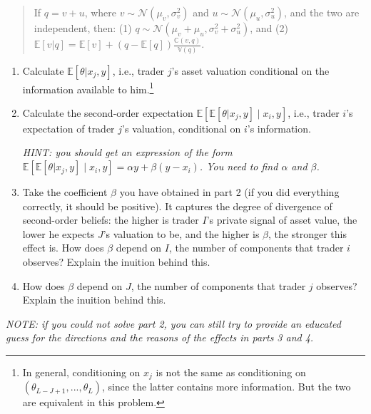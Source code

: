 \begin{quotation}
	If $q = v + u$, where $v \sim \mathcal{N}(\mu_v, \sigma_v^2)$ and $u \sim \mathcal{N}(\mu_u, \sigma_u^2)$, and the two are independent, then: (1) $q \sim \mathcal{N}(\mu_v+\mu_u, \sigma^2_v + \sigma^2_u)$, and (2) $\mathbb{E}[v|q] = \mathbb{E}[v] + (q-\mathbb{E}[q])\frac{\mathbb{C}(v,q)}{\mathbb{V}(q)}$.%
\end{quotation}
\begin{enumerate}%
	\item Calculate $\mathbb{E}\left[ \theta | x_j, y \right]$, i.e., trader $j$'s asset valuation conditional on the information available to him.\footnote{In general, conditioning on $x_j$ is not the same as conditioning on $(\theta_{L-J+1}, ..., \theta_L)$, since the latter contains more information. But the two are equivalent in this problem.}
	
	\item Calculate the second-order expectation $\mathbb{E} \left[ \mathbb{E}\left[ \theta | x_j, y \right] \mid x_i, y \right]$, i.e., trader $i$'s expectation of trader $j$'s valuation, conditional on $i$'s information. 
	
	\emph{HINT: you should get an expression of the form $\mathbb{E} \left[ \mathbb{E}\left[ \theta | x_j, y \right] \mid x_i, y \right] = \alpha y + \beta \left(y-x_i\right)$. You need to find $\alpha$ and $\beta$.}
	
	\item Take the coefficient $\beta$ you have obtained in part 2 (if you did everything correctly, it should be positive). It captures the degree of divergence of second-order beliefs: the higher is trader $I$'s private signal of asset value, the lower he expects $J$'s valuation to be, and the higher is $\beta$, the stronger this effect is. How does $\beta$ depend on $I$, the number of components that trader $i$ observes? Explain the inuition behind this.
	
	\item How does $\beta$ depend on $J$, the number of components that trader $j$ observes? Explain the inuition behind this.
\end{enumerate}
\emph{NOTE: if you could not solve part 2, you can still try to provide an educated guess for the directions and the reasons of the effects in parts 3 and 4.}


